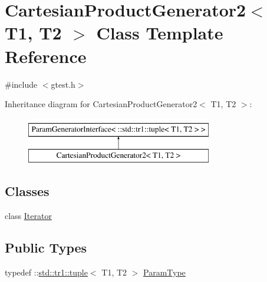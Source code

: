 \hypertarget{classtesting_1_1internal_1_1CartesianProductGenerator2}{\section{\-Cartesian\-Product\-Generator2$<$ \-T1, \-T2 $>$ \-Class \-Template \-Reference}
\label{d8/d34/classtesting_1_1internal_1_1CartesianProductGenerator2}
}


{\ttfamily \#include $<$gtest.\-h$>$}

\-Inheritance diagram for \-Cartesian\-Product\-Generator2$<$ \-T1, \-T2 $>$\-:\begin{figure}[H]
\begin{center}
\leavevmode
\includegraphics[height=2.000000cm]{d8/d34/classtesting_1_1internal_1_1CartesianProductGenerator2}
\end{center}
\end{figure}
\subsection*{\-Classes}
\begin{DoxyCompactItemize}
\item 
class \hyperlink{classtesting_1_1internal_1_1CartesianProductGenerator2_1_1Iterator}{\-Iterator}
\end{DoxyCompactItemize}
\subsection*{\-Public \-Types}
\begin{DoxyCompactItemize}
\item 
typedef \-::\hyperlink{classstd_1_1tr1_1_1tuple}{std\-::tr1\-::tuple}$<$ \-T1, \-T2 $>$ \hyperlink{classtesting_1_1internal_1_1CartesianProductGenerator2_aa0cb85aed1e62dc1934db8788770bedc}{\-Param\-Type}
\end{DoxyCompactItemize}
